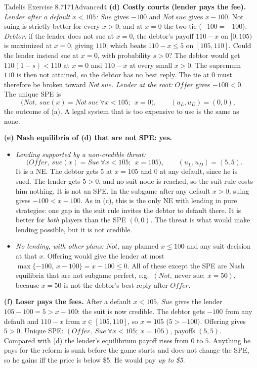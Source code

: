 \begin{exsol}{Tadelis Exercise 8.7}{171}{Advanced}{4}
\textbf{(d) Costly courts (lender pays the fee).} \emph{Lender after a default $x < 105$:}
$\mathit{Sue}$ gives $-100$ and $\mathit{Not\ sue}$ gives $x - 100$. Not suing is strictly better for
every $x > 0$, and at $x = 0$ the two tie ($-100 = -100$). \emph{Debtor:} if the lender does not sue at
$x = 0$, the debtor's payoff $110 - x$ on $[0,105)$ is maximized at $x = 0$, giving $110$, which beats
$110 - x \le 5$ on $[105,110]$. Could the lender instead sue at $x=0$, with probability $s > 0$? The
debtor would get $110(1 - s) < 110$ at $x = 0$ and $110 - x$ at every small $x > 0$. The supremum
$110$ is then not attained, so the debtor has no best reply. The tie at $0$ must therefore be broken
toward $\mathit{Not\ sue}$. \emph{Lender at the root:} $\mathit{Offer}$ gives $-100 < 0$. The unique SPE
is
\[
  \bigl(\mathit{Not},\ \mathit{sue}(x) = \mathit{Not\ sue}\ \forall x<105;\ \ x = 0\bigr),
  \qquad (u_L,u_D) = (0,0),
\]
the outcome of (a). A legal system that is too expensive to use is the same as none.

\textbf{(e) Nash equilibria of (d) that are not SPE: yes.}
\begin{itemize}
  \item \emph{Lending supported by a non-credible threat:}
  \[
    \bigl(\mathit{Offer},\ \mathit{sue}(x) = \mathit{Sue}\ \forall x < 105;\ \ x = 105\bigr),
    \qquad (u_L,u_D) = (5,5).
  \]
  It is a NE. The debtor gets $5$ at $x = 105$ and $0$ at any default, since he is sued. The lender
  gets $5 > 0$, and no suit node is reached, so the suit rule costs him nothing. It is not an SPE.
  In the subgame after any default $x > 0$, suing gives $-100 < x - 100$. As in (c), this is the
  only NE with lending in pure strategies: one gap in the suit rule invites the debtor to default
  there. It is better for \emph{both} players than the SPE $(0,0)$. The threat is what would make
  lending possible, but it is not credible.
  \item \emph{No lending, with other plans:} $\mathit{Not}$, any planned $x \le 100$ and any suit
  decision at that $x$. Offering would give the lender at most $\max\{-100,\ x - 100\} = x - 100
  \le 0$. All of these except the SPE are Nash equilibria that are not subgame perfect, e.g.\
  $(\mathit{Not},\ \text{never sue};\ x = 50)$, because $x = 50$ is not the debtor's best reply after
  $\mathit{Offer}$.
\end{itemize}

\textbf{(f) Loser pays the fees.} After a default $x<105$, $\mathit{Sue}$ gives the lender
$105 - 100 = 5 > x - 100$: the suit is now credible. The debtor gets $-100$ from any default and
$110 - x$ from $x \in [105,110]$, so $x = 105$ ($5 > -100$). Offering gives $5 > 0$. Unique SPE:
$(\mathit{Offer},\ \mathit{Sue}\ \forall x<105;\ x = 105)$, payoffs $(5,5)$. Compared with (d) the
lender's equilibrium payoff rises from $0$ to $5$. Anything he pays for the reform is sunk before the
game starts and does not change the SPE, so he gains iff the price is below \$5. He would pay
\emph{up to \$5}.


\end{exsol}
